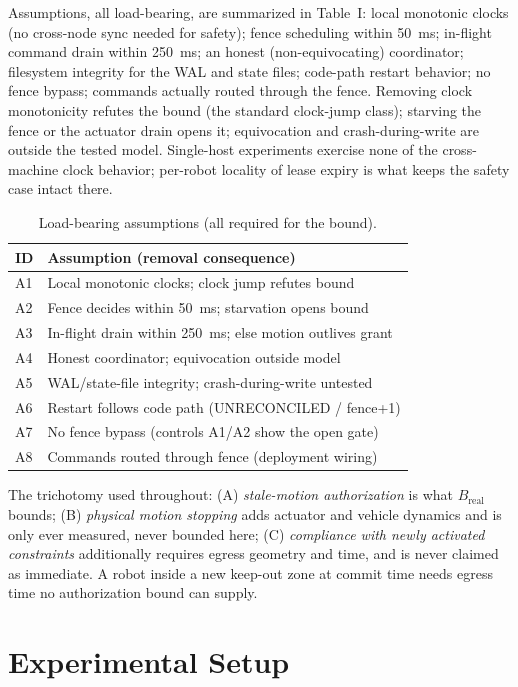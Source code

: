 \documentclass[10pt,journal]{IEEEtran}
\begin{document}
Assumptions, all load-bearing, are summarized in Table~I: local
monotonic clocks (no cross-node sync needed for safety); fence
scheduling within 50~ms; in-flight command drain within 250~ms; an
honest (non-equivocating) coordinator; filesystem integrity for the
WAL and state files; code-path restart behavior; no fence bypass;
commands actually routed through the fence. Removing clock
monotonicity refutes the bound (the standard clock-jump class);
starving the fence or the actuator drain opens it; equivocation and
crash-during-write are outside the tested model. Single-host
experiments exercise none of the cross-machine clock behavior;
per-robot locality of lease expiry is what keeps the safety case
intact there.

\begin{table}[t]
\caption{Load-bearing assumptions (all required for the bound).}
\label{tab:assump}
\centering
\footnotesize
\begin{tabular}{ll}
\hline
ID & Assumption (removal consequence) \\
\hline
A1 & Local monotonic clocks; clock jump refutes bound \\
A2 & Fence decides within 50~ms; starvation opens bound \\
A3 & In-flight drain within 250~ms; else motion outlives grant \\
A4 & Honest coordinator; equivocation outside model \\
A5 & WAL/state-file integrity; crash-during-write untested \\
A6 & Restart follows code path (UNRECONCILED / fence+1) \\
A7 & No fence bypass (controls A1/A2 show the open gate) \\
A8 & Commands routed through fence (deployment wiring) \\
\hline
\end{tabular}
\end{table}

The trichotomy used throughout: (A) \emph{stale-motion
authorization} is what $B_{\text{real}}$ bounds; (B) \emph{physical
motion stopping} adds actuator and vehicle dynamics and is only ever
measured, never bounded here; (C) \emph{compliance with newly
activated constraints} additionally requires egress geometry and
time, and is never claimed as immediate. A robot inside a new
keep-out zone at commit time needs egress time no authorization bound
can supply.

\section{Experimental Setup}
\label{sec:setup}
\end{document}
